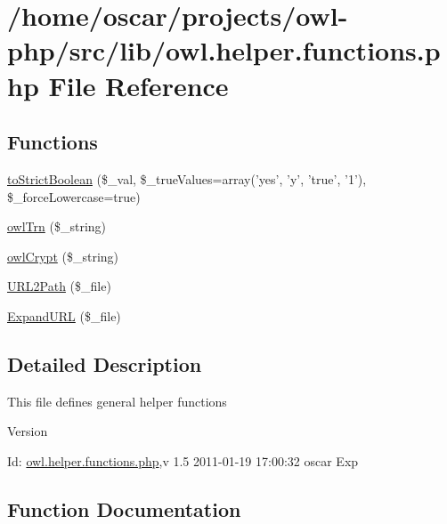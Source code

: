 \section{/home/oscar/projects/owl-\/php/src/lib/owl.helper.functions.php File Reference}
\label{owl_8helper_8functions_8php}
\subsection*{Functions}
\begin{DoxyCompactItemize}
\item 
\hyperlink{owl_8helper_8functions_8php_a2c49978306cd0e2f4f9406c20373ed02}{toStrictBoolean} (\$\_\-val, \$\_\-trueValues=array('yes', 'y', 'true', '1'), \$\_\-forceLowercase=true)
\item 
\hyperlink{owl_8helper_8functions_8php_ac0a7a4f459017820c92f439ded932d7f}{owlTrn} (\$\_\-string)
\item 
\hyperlink{owl_8helper_8functions_8php_a0836b830fe9e399265d4cf910c5dff28}{owlCrypt} (\$\_\-string)
\item 
\hyperlink{owl_8helper_8functions_8php_a0eb759657249228d1a2473ffa7de921c}{URL2Path} (\$\_\-file)
\item 
\hyperlink{owl_8helper_8functions_8php_a08f49d79aaaa581551e49017424cbe77}{ExpandURL} (\$\_\-file)
\end{DoxyCompactItemize}


\subsection{Detailed Description}
This file defines general helper functions \begin{DoxyVersion}{Version}

\end{DoxyVersion}
\begin{DoxyParagraph}{Id:}
\hyperlink{owl_8helper_8functions_8php}{owl.helper.functions.php},v 1.5 2011-\/01-\/19 17:00:32 oscar Exp 
\end{DoxyParagraph}


\subsection{Function Documentation}
